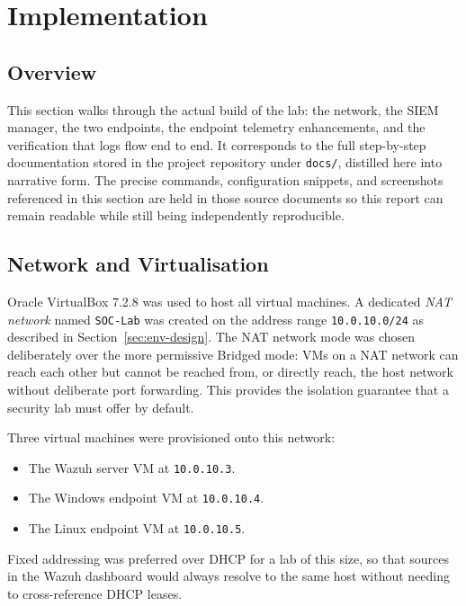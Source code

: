 \section{Implementation}
\label{sec:implementation}

\subsection{Overview}

This section walks through the actual build of the lab: the network, the SIEM
manager, the two endpoints, the endpoint telemetry enhancements, and the
verification that logs flow end to end. It corresponds to the full
step-by-step documentation stored in the project repository under
\texttt{docs/}, distilled here into narrative form. The precise commands,
configuration snippets, and screenshots referenced in this section are held in
those source documents so this report can remain readable while still being
independently reproducible.

\subsection{Network and Virtualisation}
\label{sec:impl-network}

Oracle VirtualBox 7.2.8 was used to host all virtual machines. A dedicated
\textit{NAT network} named \texttt{SOC-Lab} was created on the address range
\texttt{10.0.10.0/24} as described in Section~\ref{sec:env-design}. The NAT
network mode was chosen deliberately over the more permissive Bridged mode:
VMs on a NAT network can reach each other but cannot be reached from, or
directly reach, the host network without deliberate port forwarding. This
provides the isolation guarantee that a security lab must offer by default.

Three virtual machines were provisioned onto this network:

\begin{itemize}[leftmargin=*]
    \item The Wazuh server VM at \texttt{10.0.10.3}.
    \item The Windows endpoint VM at \texttt{10.0.10.4}.
    \item The Linux endpoint VM at \texttt{10.0.10.5}.
\end{itemize}

Fixed addressing was preferred over DHCP for a lab of this size, so that
sources in the Wazuh dashboard would always resolve to the same host without
needing to cross-reference DHCP leases.

